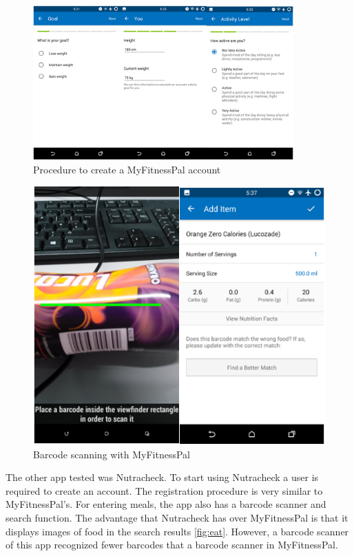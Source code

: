 \begin{figure}[ht]
\centering
\includegraphics[width=10cm]{Figures/2/mfp2.png}
\caption{Procedure to create a MyFitnessPal account}
\label{fig:mfp2}
\end{figure}

\begin{figure}[ht]
\centering
\includegraphics{Figures/2/mfp3.PNG}
\caption{Barcode scanning with MyFitnessPal}
\label{fig:mfp2}
\end{figure}

The other app tested was Nutracheck. To start using Nutracheck a user is required to create an account. The registration procedure is very similar to MyFitnessPal's. For entering meals, the app also has a barcode scanner and search function.  The advantage that Nutracheck has over MyFitnessPal is that it displays images of food in the search results \autoref{fig:eat}. However, a  barcode scanner of this app recognized fewer barcodes that a barcode scanner in MyFitnessPal.

